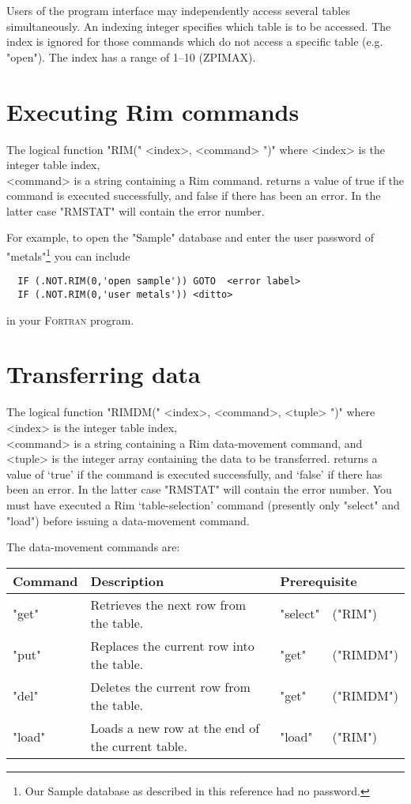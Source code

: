 \documentclass[11pt,a4paper]{report}
\def\I{\index}
\begin{document}
Users of the program interface may independently access several
tables simultaneously.  An indexing integer specifies which
table is to be accessed.
The index is ignored for
those commands which do not access
a specific table (e.g. "open").
The index has a range of 1--10 (ZPIMAX).
 
 
\section{Executing Rim commands}
%
\I{rim@"RIM"}
The logical function
"RIM(" <index>, <command> ")"
where
<index> is the integer table index,\\
       <command> is a string containing a Rim command.
returns a value of true if the command is executed successfully,
and false if there has been an error.  In the latter case
"RMSTAT" will contain the error number.
 
For example, to open the "Sample" database and enter the
user password of "metals"\footnote{Our Sample database
as described in this reference had no password.}
you can include
 
\begin{verbatim}
  IF (.NOT.RIM(0,'open sample')) GOTO  <error label>
  IF (.NOT.RIM(0,'user metals')) <ditto>
\end{verbatim}
 
in your \textsc{Fortran} program.
 
\section{Transferring data}
%
\I{rimdm@"RIMDM"}
The logical function
"RIMDM(" <index>, <command>, <tuple> ")"
where
<index> is the integer table index,\\
       <command> is a string containing a Rim data-movement command, and\\
       <tuple> is the integer array containing the data to be transferred.
returns a value of `true' if the command is executed successfully,
and `false' if there has been an error.  In the latter case
"RMSTAT" will contain the error number.
You must have executed a Rim `table-selection' command
(presently only "select" and "load")
before issuing a data-movement command.
 
The data-movement commands are:
 
\medskip
\begin{tabular}{lp{12pc}ll}
Command&
Description&
\multicolumn{2}{l}{Prerequisite}\\
\hline
"get"& Retrieves the next row from the table.& "select"&("RIM")\\
"put"& Replaces the current row into the table.& "get"&("RIMDM")\\
"del"& Deletes the current row from the table.& "get"&("RIMDM")\\
"load"& Loads a new row at the end of the current table.&
                "load"&("RIM")
\end{tabular}
 
\end{document}
